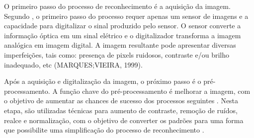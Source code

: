 O primeiro passo do processo de reconhecimento é a aquisição da imagem. Segundo , o primeiro passo do processo requer apenas um sensor de imagens e a capacidade para digitalizar o sinal produzido pelo
sensor. O sensor converte a informação óptica em um sinal elétrico e o digitalizador transforma a imagem analógica em imagem digital. A imagem resultante pode apresentar diversas imperfeições, tais como: presença de pixels ruidosos, contraste e/ou brilho inadequado, etc (MARQUES;VIEIRA, 1999).

Após a aquisição e digitalização da imagem, o próximo passo é o pré-processamento. A função chave do pré-processamento é melhorar a imagem, com o objetivo de aumentar as chances de sucesso dos processos seguintes \cite{GONZALEZ1992}. Nesta etapa, são utilizadas técnicas para aumento de contraste, remoção de ruídos, realce e normalização, com o objetivo de converter os padrões para uma forma que possibilite uma simplificação do processo de reconhecimento \cite{Rodrigues2002}.

